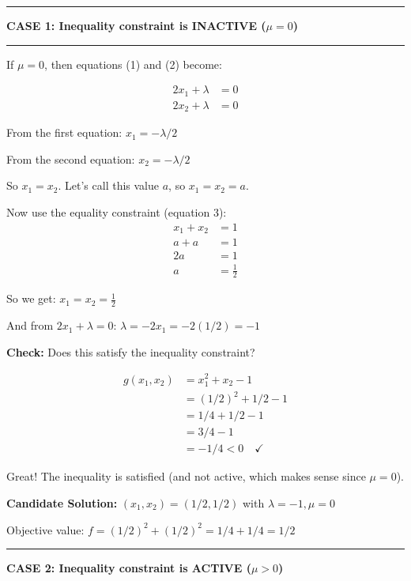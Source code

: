 \documentclass[11pt]{article}
\begin{document}
\vspace{1em}

\noindent\rule{\textwidth}{0.4pt}

\textbf{CASE 1: Inequality constraint is INACTIVE ($\mu = 0$)}

\noindent\rule{\textwidth}{0.4pt}

If $\mu = 0$, then equations (1) and (2) become:

\begin{align*}
2x_1 + \lambda &= 0\\
2x_2 + \lambda &= 0
\end{align*}

From the first equation: $x_1 = -\lambda/2$

From the second equation: $x_2 = -\lambda/2$

So $x_1 = x_2$. Let's call this value $a$, so $x_1 = x_2 = a$.

Now use the equality constraint (equation 3):
\begin{align*}
x_1 + x_2 &= 1\\
a + a &= 1\\
2a &= 1\\
a &= \frac{1}{2}
\end{align*}

So we get: $x_1 = x_2 = \frac{1}{2}$

And from $2x_1 + \lambda = 0$: $\lambda = -2x_1 = -2(1/2) = -1$

\textbf{Check:} Does this satisfy the inequality constraint?

\begin{align*}
g(x_1, x_2) &= x_1^2 + x_2 - 1\\
&= (1/2)^2 + 1/2 - 1\\
&= 1/4 + 1/2 - 1\\
&= 3/4 - 1\\
&= -1/4 < 0 \quad \checkmark
\end{align*}

Great! The inequality is satisfied (and not active, which makes sense since $\mu = 0$).

\textbf{Candidate Solution:} $(x_1, x_2) = (1/2, 1/2)$ with $\lambda = -1, \mu = 0$

Objective value: $f = (1/2)^2 + (1/2)^2 = 1/4 + 1/4 = 1/2$

\vspace{1em}

\noindent\rule{\textwidth}{0.4pt}

\textbf{CASE 2: Inequality constraint is ACTIVE ($\mu > 0$)}
\end{document}

